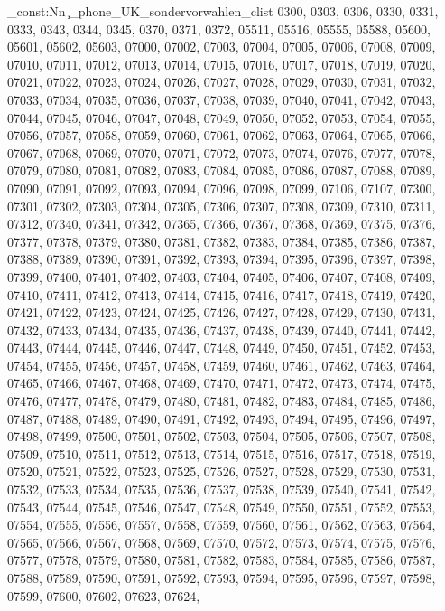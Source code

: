 \clist_const:Nn \c_phone_UK_sondervorwahlen_clist {0300,
0303,
0306,
0330,
0331,
0333,
0343,
0344,
0345,
0370,
0371,
0372,
05511,
05516,
05555,
05588,
05600,
05601,
05602,
05603,
07000,
07002,
07003,
07004,
07005,
07006,
07008,
07009,
07010,
07011,
07012,
07013,
07014,
07015,
07016,
07017,
07018,
07019,
07020,
07021,
07022,
07023,
07024,
07026,
07027,
07028,
07029,
07030,
07031,
07032,
07033,
07034,
07035,
07036,
07037,
07038,
07039,
07040,
07041,
07042,
07043,
07044,
07045,
07046,
07047,
07048,
07049,
07050,
07052,
07053,
07054,
07055,
07056,
07057,
07058,
07059,
07060,
07061,
07062,
07063,
07064,
07065,
07066,
07067,
07068,
07069,
07070,
07071,
07072,
07073,
07074,
07076,
07077,
07078,
07079,
07080,
07081,
07082,
07083,
07084,
07085,
07086,
07087,
07088,
07089,
07090,
07091,
07092,
07093,
07094,
07096,
07098,
07099,
07106,
07107,
07300,
07301,
07302,
07303,
07304,
07305,
07306,
07307,
07308,
07309,
07310,
07311,
07312,
07340,
07341,
07342,
07365,
07366,
07367,
07368,
07369,
07375,
07376,
07377,
07378,
07379,
07380,
07381,
07382,
07383,
07384,
07385,
07386,
07387,
07388,
07389,
07390,
07391,
07392,
07393,
07394,
07395,
07396,
07397,
07398,
07399,
07400,
07401,
07402,
07403,
07404,
07405,
07406,
07407,
07408,
07409,
07410,
07411,
07412,
07413,
07414,
07415,
07416,
07417,
07418,
07419,
07420,
07421,
07422,
07423,
07424,
07425,
07426,
07427,
07428,
07429,
07430,
07431,
07432,
07433,
07434,
07435,
07436,
07437,
07438,
07439, %
07440,
07441,
07442,
07443,
07444,
07445,
07446,
07447,
07448,
07449,
07450,
07451,
07452,
07453,
07454,
07455,
07456,
07457,
07458,
07459,
07460,
07461,
07462,
07463,
07464,
07465,
07466,
07467,
07468,
07469,
07470,
07471,
07472,
07473,
07474,
07475,
07476,
07477,
07478,
07479,
07480,
07481,
07482,
07483,
07484,
07485,
07486,
07487,
07488,
07489,
07490,
07491,
07492,
07493,
07494,
07495,
07496,
07497,
07498,
07499,
07500,
07501,
07502,
07503,
07504,
07505,
07506,
07507,
07508,
07509,
07510,
07511,
07512,
07513,
07514,
07515,
07516,
07517,
07518,
07519,
07520,
07521,
07522,
07523,
07525,
07526,
07527,
07528,
07529,
07530,
07531,
07532,
07533,
07534,
07535,
07536,
07537,
07538,
07539,
07540,
07541,
07542,
07543,
07544,
07545,
07546,
07547,
07548,
07549,
07550,
07551,
07552,
07553,
07554,
07555,
07556,
07557,
07558,
07559,
07560,
07561,
07562,
07563,
07564,
07565,
07566,
07567,
07568,
07569,
07570,
07572,
07573,
07574,
07575,
07576,
07577,
07578,
07579,
07580,
07581,
07582,
07583,
07584,
07585,
07586,
07587,
07588,
07589,
07590,
07591,
07592,
07593,
07594,
07595,
07596,
07597,
07598,
07599,
07600,
07602,
07623,
07624,
}
